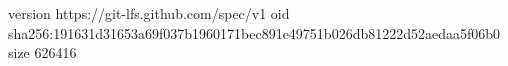 version https://git-lfs.github.com/spec/v1
oid sha256:191631d31653a69f037b1960171bec891e49751b026db81222d52aedaa5f06b0
size 626416
